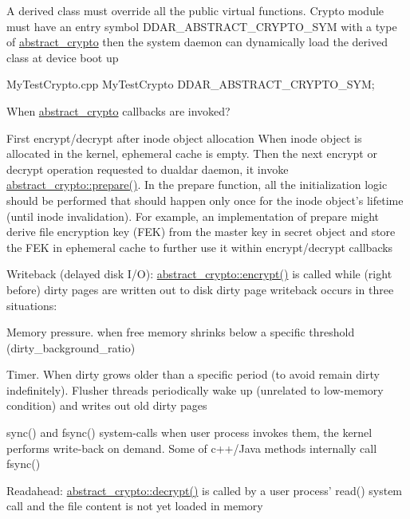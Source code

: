 \-A derived class must override all the public virtual functions. \-Crypto module must have an entry symbol \-D\-D\-A\-R\-\_\-\-A\-B\-S\-T\-R\-A\-C\-T\-\_\-\-C\-R\-Y\-P\-T\-O\-\_\-\-S\-Y\-M with a type of \hyperlink{classddar_1_1abstract__crypto}{abstract\-\_\-crypto} then the system daemon can dynamically load the derived class at device boot up


\begin{DoxyPre}
 MyTestCrypto.cpp
 MyTestCrypto DDAR\_ABSTRACT\_CRYPTO\_SYM;
 \end{DoxyPre}


\-When \hyperlink{classddar_1_1abstract__crypto}{abstract\-\_\-crypto} callbacks are invoked?


\begin{DoxyItemize}
\item \-First encrypt/decrypt after inode object allocation \-When inode object is allocated in the kernel, ephemeral cache is empty. \-Then the next encrypt or decrypt operation requested to dualdar daemon, it invoke \hyperlink{classddar_1_1abstract__crypto_a1f1a4d550c0840b4e04bc6d6129a0f13}{abstract\-\_\-crypto\-::prepare()}. \-In the prepare function, all the initialization logic should be performed that should happen only once for the inode object's lifetime (until inode invalidation). \-For example, an implementation of prepare might derive file encryption key (\-F\-E\-K) from the master key in secret object and store the \-F\-E\-K in ephemeral cache to further use it within encrypt/decrypt callbacks
\item \-Writeback (delayed disk \-I/\-O)\-: \hyperlink{classddar_1_1abstract__crypto_a17eef7aebf0ef97684af036b657a9947}{abstract\-\_\-crypto\-::encrypt()} is called while (right before) dirty pages are written out to disk dirty page writeback occurs in three situations\-:
\begin{DoxyItemize}
\item \-Memory pressure. when free memory shrinks below a specific threshold (dirty\-\_\-background\-\_\-ratio)
\item \-Timer. \-When dirty grows older than a specific period (to avoid remain dirty indefinitely). \-Flusher threads periodically wake up (unrelated to low-\/memory condition) and writes out old dirty pages
\item sync() and fsync() system-\/calls when user process invokes them, the kernel performs write-\/back on demand. \-Some of c++/\-Java methods internally call fsync()
\end{DoxyItemize}
\item \-Readahead\-: \hyperlink{classddar_1_1abstract__crypto_aaaf5ca9de70bf1b902cecc72049653b8}{abstract\-\_\-crypto\-::decrypt()} is called by a user process' read() system call and the file content is not yet loaded in memory
\end{DoxyItemize}

